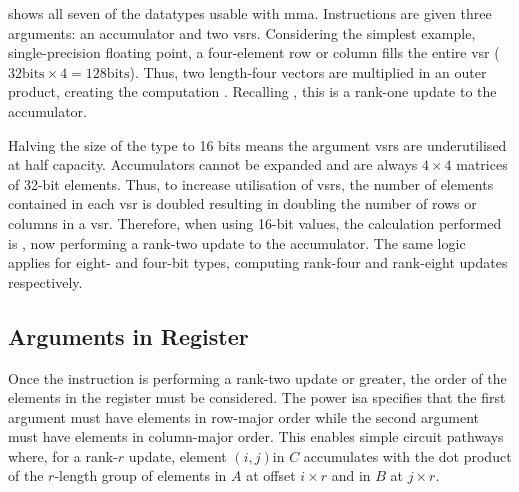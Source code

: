 \documentclass[\main/thesis.tex]{subfiles}
\begin{document}
 shows all seven of the datatypes usable with \gls{mma}.
Instructions are given three arguments: an accumulator and two \glspl{vsr}.
Considering the simplest example, single-precision floating point, a four-element row or column fills the entire \gls{vsr} ($32\text{bits} \times 4 = 128\text{bits}$).
Thus, two length-four vectors are multiplied in an outer product, creating the computation .
Recalling , this is a rank-one update to the accumulator.

Halving the size of the type to 16 bits means the argument \glspl{vsr} are underutilised at half capacity.
Accumulators cannot be expanded and are always $4 \times 4$ matrices of 32-bit elements.
Thus, to increase utilisation of \glspl{vsr}, the number of elements contained in each \gls{vsr} is doubled resulting in doubling the number of rows or columns in a \gls{vsr}.
Therefore, when using 16-bit values, the calculation performed is , now performing a rank-two update to the accumulator.
The same logic applies for eight- and four-bit types, computing rank-four and rank-eight updates respectively.

\subsection{Arguments in Register}
\label{sec:registerArguments}
Once the instruction is performing a rank-two update or greater, the order of the elements in the register must be considered.
The \gls{power} \gls{isa} specifies that the first argument must have elements in row-major order while the second argument must have elements in column-major order.
This enables simple circuit pathways where, for a rank-$r$ update, element $(i, j)$\footnotemark in $C$ accumulates with the dot product of the $r$-length group of elements in $A$ at offset $i \times r$ and in $B$ at $j \times r$.
\end{document}
